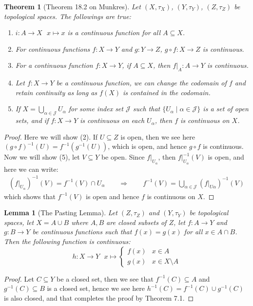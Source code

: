 \documentclass[11pt]{book}
\theoremstyle{break}
\theoremstyle{break}
\newtheorem{thm}{Theorem}[section]
\newtheorem{lem}{Lemma}[thm]
\begin{document}
\begin{thm}[Theorem 18.2 on Munkres]
Let $(X,\tau_X)$, $(Y,\tau_Y)$, $(Z,\tau_Z)$ be topological spaces. The followings are true:
\begin{enumerate}[topsep=3pt,itemsep=-1ex,partopsep=1ex,parsep=1ex]
\item $i:A \to X \ \ \ x\mapsto x$ is a continuous function for all $A\subseteq X$.
\item For continuous functions $f:X \to Y$ and $g:Y \to Z$, $g\circ f:X \to Z$ is continuous.
\item For a continuous function $f:X \to Y$, if $A\subseteq X$, then $f|_A:A \to Y$ is continuous.
\item Let $f:X \to Y$ be a continuous function, we can change the codomain of $f$ and retain continuity as long as $f(X)$ is contained in the codomain.
\item If $X = \bigcup_{\alpha \in \mathcal{J}}U_\alpha$ for some index set $\mathcal{J}$ such that $\{U_\alpha\mid \alpha \in \mathcal{J}\}$ is a set of open sets, and if $f:X \to Y$ is continuous on each $U_\alpha$, then $f$ is continuous on $X$. 
\end{enumerate}
\end{thm}
\begin{proof}
Here we will show (2). If $U \subseteq Z$ is open, then we see here $(g\circ f)^{-1}(U) = f^{-1}(g^{-1}(U))$, which is open, and hence $g\circ f$ is continuous. Now we will show (5), let $V \subseteq Y$ be open. Since $f|_{U_\alpha}$, then $f|_{U_\alpha}^{-1}(V)$ is open, and here we can write:
\begin{align*}
\left( f|_{U_\alpha}\right)^{-1}(V) = f^{-1}(V)\cap U_\alpha \qquad \Rightarrow \qquad f^{-1}(V) = \bigcup_{\alpha \in \mathcal{J}}\left( f|_{U\alpha}\right)^{-1} (V)
\end{align*}
which shows that $f^{-1}(V)$ is open and hence $f$ is continuous on $X$. 
\end{proof}

\begin{lem}[The Pasting Lemma]
Let $(Z,\tau_Z)$ and $(Y,\tau_Y)$ be topological spaces, let $X = A\cup B$ where $A,B$ are closed subsets of $Z$, let $f:A \to Y$ and $g:B \to Y$ be continuous functions such that $f(x) = g(x)$ for all $x \in A\cap B$. Then the following function is continuous:
$$h:X \to Y \ \ \ x\mapsto \begin{cases}
f(x) & x \in A\\
g(x) & x \in X\setminus A
\end{cases}$$
\end{lem}
\begin{proof}
Let $C \subseteq Y$ be a closed set, then we see that $f^{-1}(C) \subseteq A$ and $g^{-1}(C)\subseteq B$ is a closed set, hence we see here $h^{-1}(C) = f^{-1}(C) \cup g^{-1}(C)$ is also closed, and that completes the proof by Theorem 7.1.  
\end{proof}
\end{document}

